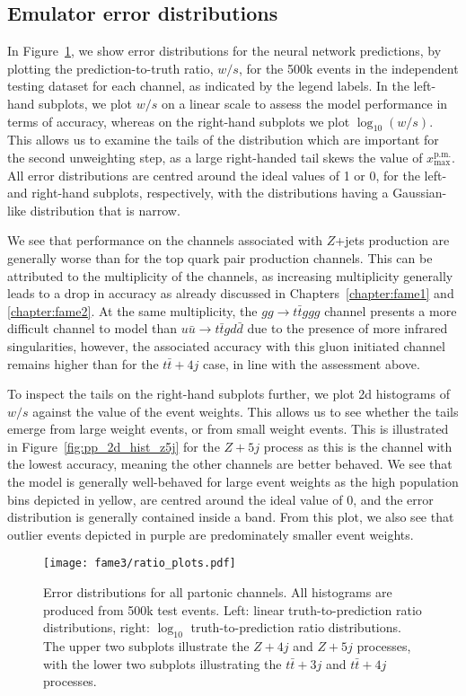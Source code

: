 \documentclass[main.tex]{subfiles}
\begin{document}
\subsection{Emulator error distributions}
In Figure~\ref{fig:pp_err_dists}, we show error distributions for the neural network predictions,
by plotting the prediction-to-truth ratio, $w/s$, for the 500k events in the independent testing
dataset for each channel, as indicated by the legend labels. In the left-hand subplots, we
plot $w/s$ on a linear scale to assess the model performance
in terms of accuracy, whereas on the right-hand subplots we plot $\log_{10}(w/s)$. This allows us to
examine the tails of the distribution which are important for the second unweighting step,
as a large right-handed tail skews the value of $x_{\mathrm{max}}^{\mathrm{p.m.}}$.
All error distributions are centred around the ideal values of 1 or 0, for the left- and
right-hand subplots, respectively, with the distributions having a Gaussian-like distribution
that is narrow.

We see that performance on the channels associated with $Z$+jets production are
generally worse than for the top quark pair production channels. This can be attributed
to the multiplicity of the channels, as increasing multiplicity generally leads to a drop
in accuracy as already discussed in Chapters~\ref{chapter:fame1} and \ref{chapter:fame2}.
At the same multiplicity, the $gg \rightarrow t\bar{t}ggg$ channel presents a more difficult channel
to model than $u\bar{u} \rightarrow t\bar{t}gd\bar{d}$ due to the presence of more
infrared singularities, however, the associated accuracy with this gluon initiated channel
remains higher than for the $t\bar{t}+4j$ case, in line with the assessment above.

To inspect the tails on the right-hand subplots further, we plot 2d histograms of $w/s$
against the value of the event weights. This allows
us to see whether the tails emerge from large weight events, or from small weight events.
This is illustrated in Figure~\ref{fig:pp_2d_hist_z5j} for the $Z+5j$ process as this
is the channel with the lowest accuracy, meaning the other channels are better behaved.
We see that the model is generally well-behaved
for large event weights as the high population bins depicted in yellow, are centred around
the ideal value of 0, and the error distribution is generally contained inside a band.
From this plot, we also see that outlier events depicted in purple are predominately
smaller event weights.

\begin{figure}
    \texttt{[image: fame3/ratio\_plots.pdf]}
    \caption{Error distributions for all partonic channels. All histograms
    are produced from 500k test events. Left: linear
    truth-to-prediction ratio distributions, right: $\log_{10}$ truth-to-prediction
    ratio distributions. The upper two subplots illustrate
    the $Z+4j$ and $Z+5j$ processes, with the lower two subplots illustrating
    the $t\bar{t}+3j$ and $t\bar{t}+4j$ processes.}
    \label{fig:pp_err_dists}
\end{figure}
\end{document}

